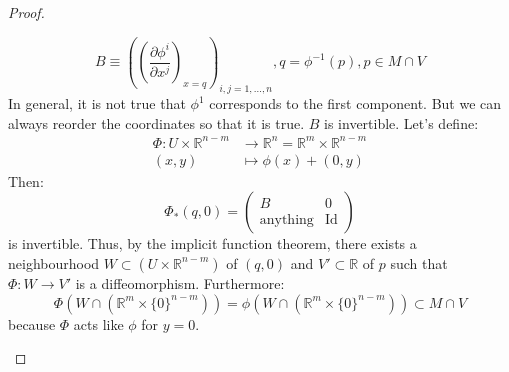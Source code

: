 \documentclass[a4paper,11pt,titlepage, article, oneside]{memoir}
\numberwithin{equation}{section}
\theoremstyle{definition}
\theoremstyle{remark}
\newcommand{\rfield}{\mathbb{R}}
\newcommand{\defonde}[2]{\frac{\partial {#1}}{\partial {#2}}}
\begin{document}
\begin{proof}
\begin{description}
$$B \equiv \left( \left (\defonde{\phi^i}{x^j} \right)_{x=q} \right)_{i, j = 1, \ldots ,n}, q = \phi^{-1}(p), p \in M \cap V$$
In general, it is not true that $\phi^1$ corresponds to the first component. But we can always reorder the coordinates so that it is true. $B$ is invertible. Let's define:
\begin{align*}
\Phi \colon U \times \rfield^{n-m} &\rightarrow \rfield^n= \rfield^m \times \rfield^{n-m} \\
(x, y) &\mapsto \phi(x) + (0, y)
\end{align*}
Then:
\[ \Phi_*(q, 0) = \left (
\begin{array}{c|c}
B & 0 \\
\hline
\text{anything} & \text{Id}
\end{array} \right) \]
is invertible. Thus, by the implicit function theorem, there exists a neighbourhood $W \subset (U \times \rfield^{n-m})$ of $(q, 0)$ and $V' \subset \rfield$ of $p$ such that $\Phi \colon W \rightarrow V'$ is a diffeomorphism. Furthermore:
\[ \Phi\left ( W \cap (\rfield^m \times \{0\}^{n-m}) \right) = \phi\left( W \cap (\rfield^m \times \{0\}^{n-m}) \right) \subset M \cap V \]
because $\Phi$ acts like $\phi$ for $y=0$.
\end{description}
\end{proof}
\end{document}
